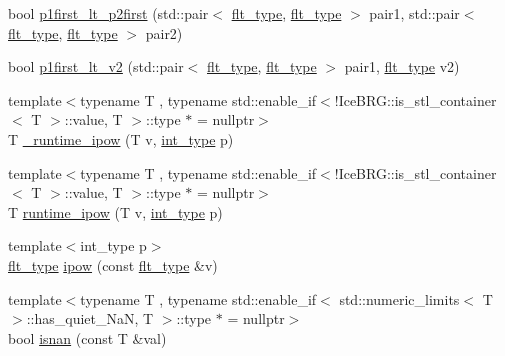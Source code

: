 \begin{DoxyCompactItemize}
\item 
bool \hyperlink{namespaceIceBRG_a7edd8a20990998ff70f754bfc538ee75}{p1first\+\_\+lt\+\_\+p2first} (std\+::pair$<$ \hyperlink{lib_2IceBRG__main_2common_8h_ad0f130a56eeb944d9ef2692ee881ecc4}{flt\+\_\+type}, \hyperlink{lib_2IceBRG__main_2common_8h_ad0f130a56eeb944d9ef2692ee881ecc4}{flt\+\_\+type} $>$ pair1, std\+::pair$<$ \hyperlink{lib_2IceBRG__main_2common_8h_ad0f130a56eeb944d9ef2692ee881ecc4}{flt\+\_\+type}, \hyperlink{lib_2IceBRG__main_2common_8h_ad0f130a56eeb944d9ef2692ee881ecc4}{flt\+\_\+type} $>$ pair2)
\item 
bool \hyperlink{namespaceIceBRG_a1f1e1dd28db99e71a21174fd343959a4}{p1first\+\_\+lt\+\_\+v2} (std\+::pair$<$ \hyperlink{lib_2IceBRG__main_2common_8h_ad0f130a56eeb944d9ef2692ee881ecc4}{flt\+\_\+type}, \hyperlink{lib_2IceBRG__main_2common_8h_ad0f130a56eeb944d9ef2692ee881ecc4}{flt\+\_\+type} $>$ pair1, \hyperlink{lib_2IceBRG__main_2common_8h_ad0f130a56eeb944d9ef2692ee881ecc4}{flt\+\_\+type} v2)
\item 
{\footnotesize template$<$typename T , typename std\+::enable\+\_\+if$<$!\+Ice\+B\+R\+G\+::is\+\_\+stl\+\_\+container$<$ T $>$\+::value, T $>$\+::type $\ast$  = nullptr$>$ }\\T \hyperlink{namespaceIceBRG_ad1f5b3c9b2eb70ba214aba9328126012}{\+\_\+runtime\+\_\+ipow} (T v, \hyperlink{lib_2IceBRG__main_2common_8h_ac4de9d9335536ac22821171deec8d39e}{int\+\_\+type} p)
\item 
{\footnotesize template$<$typename T , typename std\+::enable\+\_\+if$<$!\+Ice\+B\+R\+G\+::is\+\_\+stl\+\_\+container$<$ T $>$\+::value, T $>$\+::type $\ast$  = nullptr$>$ }\\T \hyperlink{namespaceIceBRG_a0cd4e17ad6fb6e8df06e33ebc54c349b}{runtime\+\_\+ipow} (T v, \hyperlink{lib_2IceBRG__main_2common_8h_ac4de9d9335536ac22821171deec8d39e}{int\+\_\+type} p)
\item 
{\footnotesize template$<$int\+\_\+type p$>$ }\\\hyperlink{lib_2IceBRG__main_2common_8h_ad0f130a56eeb944d9ef2692ee881ecc4}{flt\+\_\+type} \hyperlink{namespaceIceBRG_aecfcbd2c8977334d94e794f80ce161c5}{ipow} (const \hyperlink{lib_2IceBRG__main_2common_8h_ad0f130a56eeb944d9ef2692ee881ecc4}{flt\+\_\+type} \&v)
\item 
{\footnotesize template$<$typename T , typename std\+::enable\+\_\+if$<$ std\+::numeric\+\_\+limits$<$ T $>$\+::has\+\_\+quiet\+\_\+\+Na\+N, T $>$\+::type $\ast$  = nullptr$>$ }\\bool \hyperlink{namespaceIceBRG_adbe9ce0cffebbd69fcb608e82c981c88}{isnan} (const T \&val)

\end{DoxyCompactItemize}
